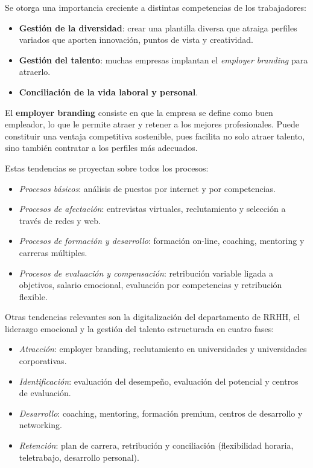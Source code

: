 \documentclass[12pt]{book} %
\providecommand{\tightlist}{%
  \setlength{\itemsep}{0pt}\setlength{\parskip}{0pt}}
\begin{document}
Se otorga una importancia creciente a distintas competencias de los
trabajadores:

\begin{itemize}
\tightlist
\item
  \textbf{Gestión de la diversidad}: crear una plantilla diversa que
  atraiga perfiles variados que aporten innovación, puntos de vista y
  creatividad.
\item
  \textbf{Gestión del talento}: muchas empresas implantan el
  \emph{employer branding} para atraerlo.
\item
  \textbf{Conciliación de la vida laboral y personal}.
\end{itemize}

El \textbf{employer branding} consiste en que la empresa se define como
buen empleador, lo que le permite atraer y retener a los mejores
profesionales. Puede constituir una ventaja competitiva sostenible, pues
facilita no solo atraer talento, sino también contratar a los perfiles
más adecuados.

Estas tendencias se proyectan sobre todos los procesos:

\begin{itemize}
\tightlist
\item
  \emph{Procesos básicos}: análisis de puestos por internet y por
  competencias.
\item
  \emph{Procesos de afectación}: entrevistas virtuales, reclutamiento y
  selección a través de redes y web.
\item
  \emph{Procesos de formación y desarrollo}: formación on-line,
  coaching, mentoring y carreras múltiples.
\item
  \emph{Procesos de evaluación y compensación}: retribución variable
  ligada a objetivos, salario emocional, evaluación por competencias y
  retribución flexible.
\end{itemize}

Otras tendencias relevantes son la digitalización del departamento de
RRHH, el liderazgo emocional y la gestión del talento estructurada en
cuatro fases:

\begin{itemize}
\tightlist
\item
  \emph{Atracción}: employer branding, reclutamiento en universidades y
  universidades corporativas.
\item
  \emph{Identificación}: evaluación del desempeño, evaluación del
  potencial y centros de evaluación.
\item
  \emph{Desarrollo}: coaching, mentoring, formación premium, centros de
  desarrollo y networking.
\item
  \emph{Retención}: plan de carrera, retribución y conciliación
  (flexibilidad horaria, teletrabajo, desarrollo personal).
\end{itemize}
\end{document}
